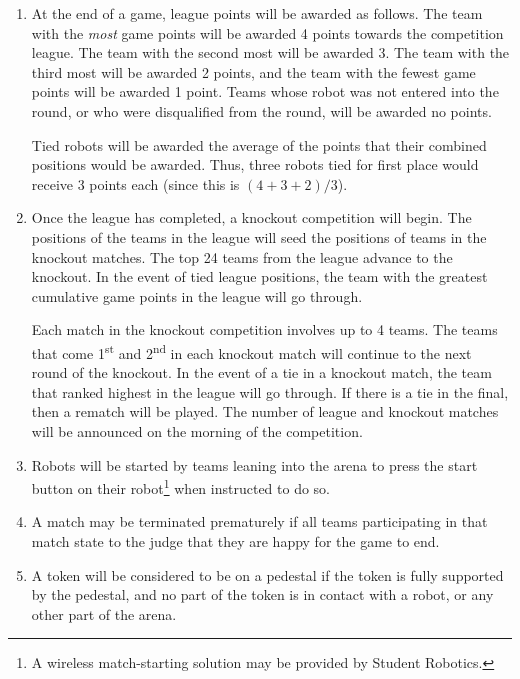 \begin{enumerate}
\item At the end of a game, league points will be awarded as follows.
      The team with the \emph{most} game points will be awarded 4 points towards the competition league.
      The team with the second most will be awarded 3.
      The team with the third most will be awarded 2 points, and the team with the fewest game points will be awarded 1 point.
      Teams whose robot was not entered into the round, or who were disqualified from the round, will be awarded no points.

      Tied robots will be awarded the average of the points that their combined positions would be awarded.
      Thus, three robots tied for first place would receive 3 points each (since this is $(4+3+2)/3$).

\item Once the league has completed, a knockout competition will begin.
      The positions of the teams in the league will seed the positions of teams in the knockout matches.
      The top 24 teams from the league advance to the knockout.
      In the event of tied league positions, the team with the greatest cumulative game points in the league will go through.

      Each match in the knockout competition involves up to 4 teams.
      The teams that come 1\textsuperscript{st} and 2\textsuperscript{nd} in each knockout match will continue to the next round of the knockout.
      In the event of a tie in a knockout match, the team that ranked highest in the league will go through.
      If there is a tie in the final, then a rematch will be played.
      The number of league and knockout matches will be announced on the morning of the competition.

\item Robots will be started by teams leaning into the arena to press the start button on their robot\footnote{A wireless match-starting solution may be provided by Student Robotics.} when instructed to do so.


\item A match may be terminated prematurely if all teams participating in that match state to the judge that they are happy for the game to end.

\item A token will be considered to be on a pedestal if the token is fully supported by the pedestal, and no part of the token is in contact with a robot, or any other part of the arena.

\end{enumerate}
